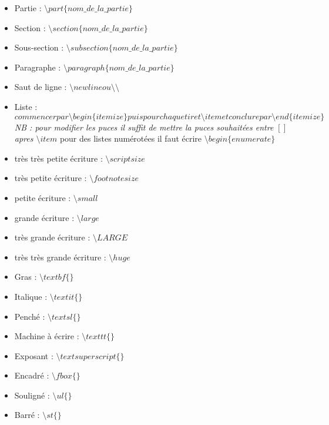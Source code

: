 \begin{itemize}
\item Partie : $ \setminus part\lbrace \textit{nom\_ de\_ la\_ partie} \rbrace $

\item Section : $ \setminus section\lbrace \textit{nom\_ de\_ la\_ partie}\rbrace $

\item Sous-section : $ \setminus subsection\lbrace \textit{nom\_ de\_ la\_ partie} \rbrace $

\item Paragraphe : $ \setminus paragraph\lbrace \textit{nom\_ de\_ la\_ partie}\rbrace $

\item Saut de ligne : $ \setminus newline ou \setminus \setminus $

\item Liste : $ commencer par \setminus begin \lbrace itemize \rbrace puis pour chaque tiret \setminus item et conclure
par \setminus end\lbrace itemize \rbrace $ \textit{ NB : pour modifier les puces il suffit de mettre la puces souhaitées
entre $ [  ] $ apres $ \setminus item $}
\newline pour des listes numérotées il faut écrire $\setminus begin\lbrace enumerate\rbrace $

\item très très petite écriture : $ \setminus scriptsize $

\item très petite écriture : $ \setminus footnotesize $

\item petite écriture : $ \setminus small $

\item grande écriture : $ \setminus large$

\item très grande écriture : $ \setminus LARGE $

\item très très grande écriture : $ \setminus huge $

\item Gras :  $ \setminus textbf\lbrace\rbrace $
\item Italique :  $ \setminus textit\lbrace\rbrace $
\item Penché :  $ \setminus textsl\lbrace\rbrace $
\item Machine à écrire :  $ \setminus texttt\lbrace\rbrace $
\item Exposant :  $ \setminus textsuperscript\lbrace\rbrace $
\item Encadré :  $ \setminus fbox\lbrace\rbrace $
\item Souligné :  $ \setminus ul\lbrace\rbrace $
\item Barré :  $ \setminus st\lbrace\rbrace $
\end{itemize}
